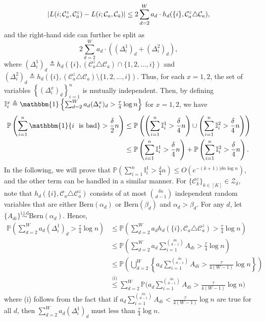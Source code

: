 \documentclass{article}
\newcommand\af{\alpha_d}
\newcommand\bt{\beta_d}
\begin{document}
$$
|L(i; \mathcal{C}_a^z, \mathcal{C}_{\Bar{a}}^z)-L(i; \mathcal{C}_a, \mathcal{C}_{\Bar{a}})| \leq 2 \sum_{d=2}^{W}  a_d \cdot  h_d(\{i\}, \mathcal{C}_a^z \triangle \mathcal{C}_a),
$$
and the right-hand side  can further be split as
 $$
2 \sum_{d=2}^{W}  a_d \cdot  ((\Delta_i^1)_d + (\Delta_i^2)_d  ),
$$
where $(\Delta_i^1)_d \triangleq h_d(\{i\}, (\mathcal{C}_a^z \triangle \mathcal{C}_a) \cap \{ 1,2,..., i\} )$ and $(\Delta_i^2)_d \triangleq h_d(\{i\}, (\mathcal{C}_a^z \triangle \mathcal{C}_a) \setminus \{1,2,...,i\} )$. Thus, for each $x=1, 2$, the set of variables $\left\{ (\Delta_i^x)_d \right\}_{i=1}^{n}$ is mutually independent. Then, by defining $\mathbb{I}_i^{x} \triangleq \mathbbm{1}\left\{ \sum_{d=2}^{W} a_d (\Delta_i^x)_d > \frac{\tau}{4 } \log n \right\}$ for $x=1, 2$, we have
$$
\begin{aligned}
	\mathbb{P}\left( \sum_{i=1}^{n} \mathbbm{1} \{ i \text{ \ is bad} \} > \frac{\delta}{2} n \right) & \leq \mathbb{P}\left( \left( \sum_{i=1}^{n} \mathbb{I}_i^1 > \frac{\delta}{4} n \right) \cup \left( \sum_{i=1}^{n} \mathbb{I}_i^2 > \frac{\delta}{4} n \right) \right) \\
	& \leq \mathbb{P}\left( \sum_{i=1}^{n} \mathbb{I}_i^1 > \frac{\delta}{4} n \right) + \mathbb{P}\left( \sum_{i=1}^{n} \mathbb{I}_i^2 > \frac{\delta}{4} n \right).
\end{aligned}
$$
In the following, we will prove that $\mathbb{P}\left(\sum_{i=1}^{n} \mathbb{I}_i^1 > \frac{\delta}{4} n\right)  \leq O(e^{-(k+1))\delta n \log n})$, and the other term can be handled in a similar manner. For $\{ \mathcal{C}^z_k \}_{k \in [K]} \in \mathcal{Z}_\delta$, note that $h_d(\{i\}, \mathcal{C}_a \triangle \mathcal{C}_a^z)$ consists of at most $\binom{\delta n}{d -1}$ independent random variables that are either $\text{Bern}(\af)$ or $\text{Bern}(\bt)$ and $\af > \bt$. For any $d$, let $\{A_{di}\} \overset{\text{i.i.d}}{\sim} \text{Bern}(\alpha_d) $. Hence,
\begin{equation}\label{s65}
    \begin{aligned}
        \mathbb{P}\left( \sum_{d=2}^W a_d (\Delta_i^1)_d  > \frac{\tau}{4 } \log n \right) &\leq \mathbb{P}\left( \sum_{d=2}^W a_d h_d(\{i\}, \mathcal{C}_a \triangle \mathcal{C}_a^z) > \frac{\tau}{4 } \log n \right) \\
        &\leq \mathbb{P} \left( \sum_{d=2}^W a_d \sum_{i=1}^{\binom{\delta n}{d-1}} A_{di} > \frac{\tau}{4 } \log n \right) \\
        &\leq \mathbb{P} \left( \bigcup_{d=2}^W \left\{ a_d \sum_{i=1}^{\binom{\delta n}{d-1}} A_{di} > \frac{\tau}{4 (W-1) } \log n \right\} \right) \\
        & \overset{\text{(i)}}{\leq} \sum_{d=2}^W \mathbb{P} \Bigg( a_d \sum_{i=1}^{\binom{\delta n}{d-1}} A_{di} > \frac{\tau}{4 (W-1)  } \log n  \Bigg) 
    \end{aligned}
\end{equation}
where (i) follows from the fact that if $a_d \sum_{i=1}^{\binom{\delta n}{d-1}} A_{di} < \frac{\tau}{4 (W-1)  } \log n$ are true for all $d$, then $\sum_{d=2}^W a_d (\Delta_i^1)_d$ must less than $\frac{\tau}{4 } \log n$.
\end{document}
